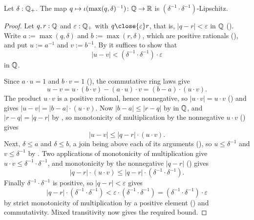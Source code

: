 \begin{lemma}
  \label{boundedRecipQIsLipschitzWith}
  Let $\delta : \mathbb{Q}_{+}$. The map $q \mapsto \iota(\max(q, \delta)^{-1}) \colon \mathbb{Q} \to \mathbb{R}$ is $(\delta^{-1} \cdot \delta^{-1})$-Lipschitz.
\end{lemma}
\begin{proof}
  Let $q, r : \mathbb{Q}$ and $\varepsilon : \mathbb{Q}_{+}$ with $q \close{\varepsilon} r$, that is, $\lvert q - r \rvert < \varepsilon$ in $\mathbb{Q}$ (). Write $a := \max(q, \delta)$ and $b := \max(r, \delta)$, which are positive rationals (), and put $u := a^{-1}$ and $v := b^{-1}$. By  it suffices to show that
  \[
    \lvert u - v \rvert < (\delta^{-1} \cdot \delta^{-1}) \cdot \varepsilon
  \]
  in $\mathbb{Q}$.

  Since $a \cdot u = 1$ and $b \cdot v = 1$ (), the commutative ring laws give
  \[
    u - v = u \cdot (b \cdot v) - (a \cdot u) \cdot v = (b - a) \cdot (u \cdot v).
  \]
  The product $u \cdot v$ is a positive rational, hence nonnegative, so $\lvert u \cdot v \rvert = u \cdot v$ () and  gives $\lvert u - v \rvert = \lvert b - a \rvert \cdot (u \cdot v)$. Now $\lvert b - a \rvert \le \lvert r - q \rvert$ by  in $\mathbb{Q}$, and $\lvert r - q \rvert = \lvert q - r \rvert$ by , so monotonicity of multiplication by the nonnegative $u \cdot v$ () gives
  \[
    \lvert u - v \rvert \le \lvert q - r \rvert \cdot (u \cdot v).
  \]
  Next, $\delta \le a$ and $\delta \le b$, a join being above each of its arguments (), so $u \le \delta^{-1}$ and $v \le \delta^{-1}$ by . Two applications of monotonicity of multiplication give $u \cdot v \le \delta^{-1} \cdot \delta^{-1}$, and monotonicity by the nonnegative $\lvert q - r \rvert$ () gives
  \[
    \lvert q - r \rvert \cdot (u \cdot v) \le \lvert q - r \rvert \cdot (\delta^{-1} \cdot \delta^{-1}).
  \]
  Finally $\delta^{-1} \cdot \delta^{-1}$ is positive, so $\lvert q - r \rvert < \varepsilon$ gives
  \[
    \lvert q - r \rvert \cdot (\delta^{-1} \cdot \delta^{-1}) < \varepsilon \cdot (\delta^{-1} \cdot \delta^{-1}) = (\delta^{-1} \cdot \delta^{-1}) \cdot \varepsilon
  \]
  by strict monotonicity of multiplication by a positive element () and commutativity. Mixed transitivity now gives the required bound.
\end{proof}

